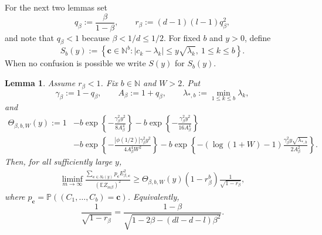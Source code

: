\documentclass[11pt]{amsart}
\theoremstyle{plain}
\newtheorem{lemma}[theorem]{Lemma}
\numberwithin{equation}{section}
\numberwithin{theorem}{section}
\numberwithin{figure}{section}
\begin{document}
For the next two lemmas set
\begin{equation}\label{eq:q-r-def}
  q_\beta:=\frac{\beta}{1-\beta},\qquad
  r_\beta:=(d-1)(l-1)q_\beta^2,
\end{equation}
and note that \(q_\beta<1\) because \(\beta<1/d\le1/2\).  For fixed \(b\) and \(y>0\),
define
\begin{equation}\label{dsy}
  S_b(y):=\left\{\mathbf c\in\mathbb N^b:
  |c_k-\lambda_k|\le y\sqrt{\lambda_k},\ 1\le k\le b\right\}.
\end{equation}
When no confusion is possible we write \(S(y)\) for \(S_b(y)\).

\begin{lemma}\label{l35}
Assume \(r_\beta<1\).  Fix \(b\in\mathbb N\) and \(W>2\).  Put
\[
  \gamma_\beta:=1-q_\beta,
  \qquad A_\beta:=1+q_\beta,
  \qquad \lambda_{*,b}:=\min_{1\le k\le b}\lambda_k,
\]
and
\begin{align*}
\Theta_{\beta,b,W}(y)
:=1&-b\exp\left\{-\frac{\gamma_\beta^2y^2}{8A_\beta^4}\right\}
    -b\exp\left\{-\frac{\gamma_\beta^2y^2}{16A_\beta^4}\right\} \\
&-b\exp\left\{-\frac{|\phi(1/2)|\gamma_\beta^2y^2}{4A_\beta^4W^2}\right\}
    -b\exp\left\{-(\log(1+W)-1)
       \frac{\gamma_\beta^2y\sqrt{\lambda_{*,b}}}{2A_\beta^2}\right\}.
\end{align*}
Then, for all sufficiently large \(y\),
\begin{align*}
\liminf_{m\to\infty}
\frac{\sum_{\mathbf c\in S_b(y)}p_{\mathbf c}E_{\beta,\mathbf c}^2}
     {(\mathbb E Z_{m\beta})^2}
\ge
\Theta_{\beta,b,W}(y)
\left(1-r_\beta^b\right)
\frac1{\sqrt{1-r_\beta}},
\end{align*}
where \(p_{\mathbf c}=\mathbb P((C_1,\ldots,C_b)=\mathbf c)\).
Equivalently,
\[
  \frac1{\sqrt{1-r_\beta}}
  =\frac{1-\beta}{\sqrt{1-2\beta-(dl-d-l)\beta^2}}.
\]
\end{lemma}
\end{document}
